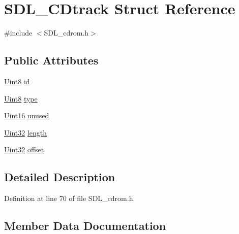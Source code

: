 \hypertarget{struct_s_d_l___c_dtrack}{}\section{S\+D\+L\+\_\+\+C\+Dtrack Struct Reference}
\label{struct_s_d_l___c_dtrack}


{\ttfamily \#include $<$S\+D\+L\+\_\+cdrom.\+h$>$}

\subsection*{Public Attributes}
\begin{DoxyCompactItemize}
\item 
\hyperlink{_s_d_l__stdinc_8h_a2944638813a090aa23e62f4da842c3e2}{Uint8} \hyperlink{struct_s_d_l___c_dtrack_aee8f951ef762bef0ab46e7424ad6c6a4}{id}
\item 
\hyperlink{_s_d_l__stdinc_8h_a2944638813a090aa23e62f4da842c3e2}{Uint8} \hyperlink{struct_s_d_l___c_dtrack_adc74ef4de78c8418f229e3efd24a076f}{type}
\item 
\hyperlink{_s_d_l__stdinc_8h_a31fcc0a076c9068668173ee26d33e42b}{Uint16} \hyperlink{struct_s_d_l___c_dtrack_a2ec24a93792ff7a537f7554a89d596cf}{unused}
\item 
\hyperlink{_s_d_l__stdinc_8h_add440eff171ea5f55cb00c4a9ab8672d}{Uint32} \hyperlink{struct_s_d_l___c_dtrack_a15ae81e65a360c3a334e4323af6f2da5}{length}
\item 
\hyperlink{_s_d_l__stdinc_8h_add440eff171ea5f55cb00c4a9ab8672d}{Uint32} \hyperlink{struct_s_d_l___c_dtrack_a5c0875650889c529cefee6c2684901f5}{offset}
\end{DoxyCompactItemize}


\subsection{Detailed Description}


Definition at line 70 of file S\+D\+L\+\_\+cdrom.\+h.



\subsection{Member Data Documentation}
\hypertarget{struct_s_d_l___c_dtrack_aee8f951ef762bef0ab46e7424ad6c6a4}{}
